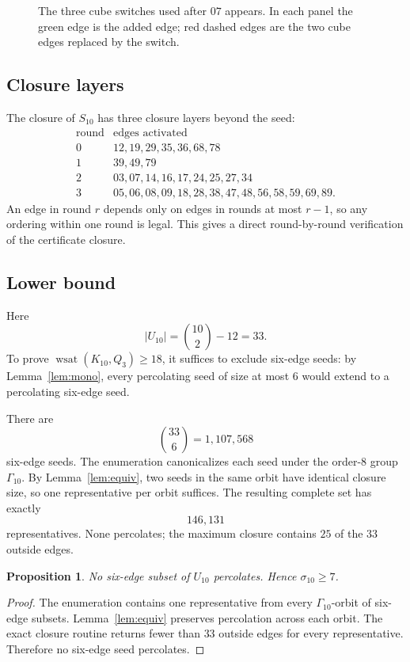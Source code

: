 \documentclass[11pt]{article}
\numberwithin{equation}{section}
\newtheorem{proposition}[theorem]{Proposition}
\newcommand{\wsat}{\operatorname{wsat}}
\begin{document}
\begin{figure}[t]
\centering
\resizebox{0.96\linewidth}{!}{}
\caption{The three cube switches used after $07$ appears. In each panel the green edge is the added edge; red dashed edges are the two cube edges replaced by the switch.}
\label{fig:switches}
\end{figure}

\subsection{Closure layers}
The closure of $S_{10}$ has three closure layers beyond the seed:
\[
\begin{array}{c|l}
\text{round}&\text{edges activated}\\ \hline
0&12,19,29,35,36,68,78\\
1&39,49,79\\
2&03,07,14,16,17,24,25,27,34\\
3&05,06,08,09,18,28,38,47,48,56,58,59,69,89.
\end{array}
\tag{5.4}
\]
An edge in round $r$ depends only on edges in rounds at most $r-1$, so any ordering within one round is legal. This gives a direct round-by-round verification of the certificate closure.

\subsection{Lower bound}
Here
\[
|U_{10}|=\binom{10}{2}-12=33.
\]
To prove $\wsat(K_{10},Q_3)\ge18$, it suffices to exclude six-edge seeds: by Lemma~\ref{lem:mono}, every percolating seed of size at most $6$ would extend to a percolating six-edge seed.

There are
\[
\binom{33}{6}=1,107,568
\]
six-edge seeds. The enumeration canonicalizes each seed under the order-$8$ group $\Gamma_{10}$. By Lemma~\ref{lem:equiv}, two seeds in the same orbit have identical closure size, so one representative per orbit suffices. The resulting complete set has exactly
\[
146,131
\]
representatives. None percolates; the maximum closure contains $25$ of the $33$ outside edges.

\begin{proposition}\label{prop:n10lower}
No six-edge subset of $U_{10}$ percolates. Hence $\sigma_{10}\ge7$.
\end{proposition}

\begin{proof}
The enumeration contains one representative from every $\Gamma_{10}$-orbit of six-edge subsets. Lemma~\ref{lem:equiv} preserves percolation across each orbit. The exact closure routine returns fewer than $33$ outside edges for every representative. Therefore no six-edge seed percolates.
\end{proof}
\end{document}
